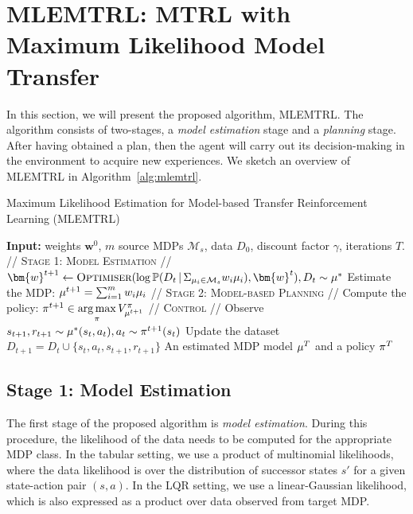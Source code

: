 \section{MLEMTRL: MTRL with Maximum Likelihood Model Transfer}\label{sec:algorithms}
In this section, we will present the proposed algorithm, MLEMTRL. The algorithm consists of two-stages, a \emph{model estimation} stage and a \emph{planning} stage. After having obtained a plan, then the agent will carry out its decision-making in the environment to acquire new experiences. We sketch an overview of MLEMTRL in Algorithm~\ref{alg:mlemtrl}.
\begin{algorithm}[ht!]
\caption{Maximum Likelihood Estimation for Model-based Transfer Reinforcement Learning (MLEMTRL)}\label{alg:mlemtrl}
\begin{algorithmic}[1]
\State \textbf{Input:} weights $\bm{w}^0$, $m$ source MDPs $\mathcal{M}_s$, data $D_0$, discount factor $\gamma$, iterations $T$.
\State\textsc{// Stage 1: Model Estimation //}
\State $\bm{w}^{t+1}\leftarrow  \textsc{Optimiser}(\log\mathbb{P}(D_t \, | \, \Sigma_{\mdp_i \in \mathcal{M}_s} w_i \mdp_i), \bm{w}^t) , D_t \sim \mdp^{*}$\label{lin:optimiser}
\State Estimate the MDP: $\mu^{t+1} = \sum_{i=1}^m w_i \mu_i$
\State\textsc{// Stage 2: Model-based Planning //}
\State Compute the policy: $\pi^{t+1} \in \underset{\pi}{\arg\max} \, V_{\mu^{t+1}}^\pi$
\State\textsc{// Control //}
\State Observe $s_{t+1}, r_{t+1} \sim \mu^{*}(s_t, a_t), a_t\sim \pi^{t+1}(s_t)$
\State Update the dataset $D_{t+1} = D_t \cup \{s_t, a_t, s_{t+1}, r_{t+1}\}$
\EndFor
\Return An estimated MDP model $\mu^T$ and a policy $\pi^T$
\end{algorithmic}
\end{algorithm}

\subsection{Stage 1: Model Estimation}
The first stage of the proposed algorithm is \emph{model estimation}. During this procedure, the likelihood of the data needs to be computed for the appropriate MDP class. In the tabular setting, we use a product of multinomial likelihoods, where the data likelihood is over the distribution of successor states $s'$ for a given state-action pair $(s, a)$. In the LQR setting, we use a linear-Gaussian likelihood, which is also expressed as a product over data observed from target MDP. 


